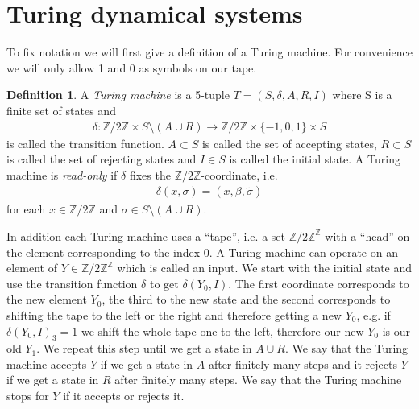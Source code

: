 \documentclass[12pt,a4paper]{scrartcl}
\theoremstyle{plain}
\theoremstyle{definition}
\newtheorem{Definition}[Theorem]{Definition}
\newcommand{\Z}{\mathbb{Z}} %
\newcommand{\2}{\mathbb{Z} / 2 \mathbb{Z}}
\newcommand{\1}{\bar{1}}
\newcommand{\0}{\bar{0}}
\begin{document}
\section{Turing dynamical systems}
To fix notation we will first give a definition of a Turing machine. For convenience we will only allow 1 and 0 as symbols on our tape.
\begin{Definition}
	A \emph{Turing machine} is a 5-tuple $T=(S,\delta, A, R, I)$ where S is a finite set of states and 
	\begin{align*}
		\delta\colon\2 \times S \setminus(A \cup R) \to \2 \times \{-1, 0, 1\} \times S
	\end{align*}
	is called the transition function. $A \subset S$ is called the set of accepting states, $R \subset S$ is called the set of rejecting states and $I \in S$ is called the initial state.
	A Turing machine is \emph{read-only} if $\delta$ fixes the $\2$-coordinate, i.e.
	\begin{align*}
		\delta (x, \sigma) = (x, \beta, \tilde{\sigma})
	\end{align*}
	for each $x \in \2$ and $\sigma \in S \setminus(A \cup R)$.
\end{Definition}
In addition each Turing machine uses a ``tape'', i.e. a set $\Z / 2\Z ^{\Z}$ with a ``head'' on the element corresponding to the index 0. A Turing machine can operate on an element of $Y \in \Z / 2\Z ^{\Z}$ which is called an input. We start with the initial state and use the transition function $\delta$ to get $\delta(Y_0, I)$. The first coordinate corresponds to the new element $Y_0$, the third to the new state and the second corresponds to shifting the tape to the left or the right and therefore getting a new $Y_0$, e.g. if $\delta(Y_0, I)_3 = 1$ we shift the whole tape one to the left, therefore our new $Y_0$ is our old $Y_1$. We repeat this step until we get a state in $A \cup R$. We say that the Turing machine accepts $Y$ if we get a state in $A$ after finitely many steps and it rejects $Y$ if we get a state in $R$ after finitely many steps. We say that the Turing machine stops for $Y$ if it accepts or rejects it.
\end{document}
